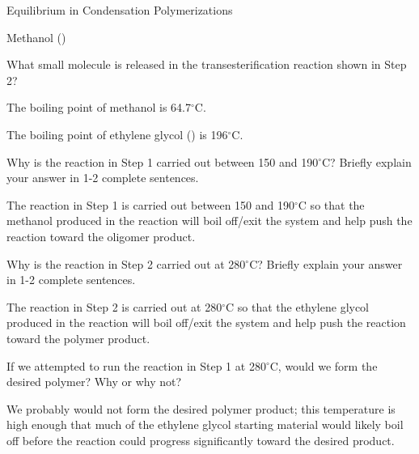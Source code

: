 \begin{activity}{Equilibrium in Condensation Polymerizations}
\begin{ctqs}
			\begin{solution}[0.75in]
				Methanol ()
			\end{solution}
		
		\question What small molecule is released in the transesterification reaction shown in Step 2?
		
			\begin{solution}[0.75in]
			\end{solution}
			
\end{ctqs}

\begin{infobox}
	
	The boiling point of methanol is 64.7${}^\circ$C.
	
	The boiling point of ethylene glycol () is 196${}^\circ$C.
	
\end{infobox}

\begin{ctqs}
	
	\question Why is the reaction in Step 1 carried out between 150 and 190${}^\circ$C?  Briefly explain your answer in 1-2 complete sentences.
	
		\begin{solution}[2in]
			The reaction in Step 1 is carried out between 150 and 190${}^\circ$C so that the methanol produced in the reaction will boil off/exit the system and help push the reaction toward the oligomer product.
		\end{solution}
	
	\question Why is the reaction in Step 2 carried out at 280${}^\circ$C?  Briefly explain your answer in 1-2 complete sentences.
	
		\begin{solution}[2in]
			The reaction in Step 2 is carried out at 280${}^\circ$C so that the ethylene glycol produced in the reaction will boil off/exit the system and help push the reaction toward the polymer product.
		\end{solution}
	
	\question If we attempted to run the reaction in Step 1 at 280${}^\circ$C, would we form the desired polymer? Why or why not?
	
		\begin{solution}[2in]
			We probably would not form the desired polymer product; this temperature is high enough that much of the ethylene glycol starting material would likely boil off before the reaction could progress significantly toward the desired product.
		\end{solution}
		

\end{ctqs}
\end{activity}
